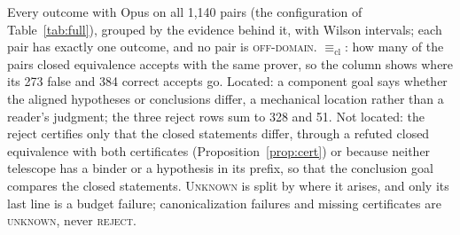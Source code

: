 \documentclass[10pt]{article}
\theoremstyle{definition}
\newcommand{\Ecl}{\mathrel{\equiv_{\mathrm{cl}}}}
\newcommand{\V}[1]{\textsc{#1}}
\begin{document}
\begin{table}[t]
\caption{Every outcome with Opus on all 1,140 pairs (the configuration of Table~\ref{tab:full}),
grouped by the evidence behind it, with Wilson intervals; each pair has exactly one outcome, and
no pair is \V{off-domain}. $\Ecl$: how many of the pairs closed equivalence accepts with the
same prover, so the column shows where its 273 false and 384 correct accepts go. Located: a
component goal says whether the aligned hypotheses or conclusions differ, a mechanical location
rather than a reader's judgment; the three reject rows sum to 328 and 51. Not located: the reject certifies only that the closed statements differ,
through a refuted closed equivalence with both certificates (Proposition~\ref{prop:cert}) or
because neither telescope has a binder or a hypothesis in its prefix, so that the conclusion
goal compares the closed statements. \V{Unknown} is split by where it arises, and only its last
line is a budget failure; canonicalization failures and missing certificates are
\V{unknown}, never \V{reject}.}
\label{tab:dist}
\end{table}
\end{document}

